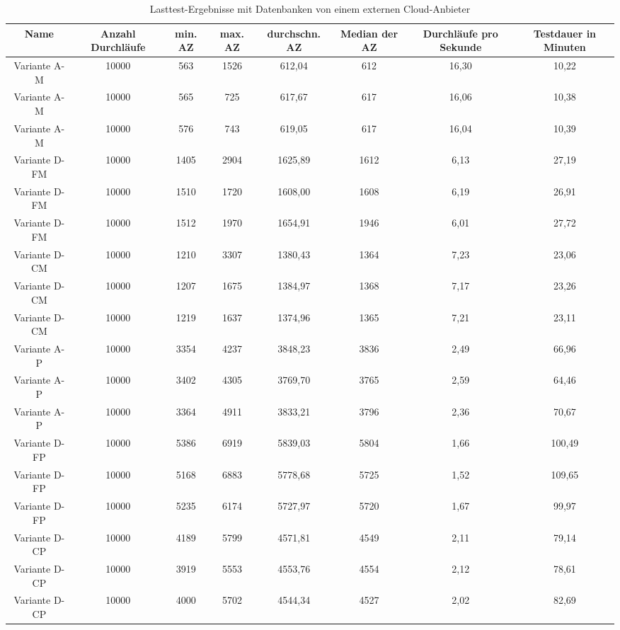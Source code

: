 \begin{landscape}
	\begin{table}[h!]
		\centering
		\small
		\begin{tabular}{ |c|c|c|c|c|c|c|c|} 
			\hline
			Name & Anzahl Durchläufe & min. AZ & max. AZ & durchschn. AZ & Median der AZ & Durchläufe pro Sekunde & Testdauer in Minuten\\ 
			\hline
			Variante A-M & 10000 & 563 & 1526 & 612,04 & 612 & 16,30 & 10,22 \\
			\hline
			Variante A-M & 10000 & 565 & 725 & 617,67 & 617 & 16,06 & 10,38 \\
			\hline
			Variante A-M & 10000 & 576 & 743 & 619,05 & 617 & 16,04 & 10,39 \\
			\hline
			Variante D-FM & 10000 & 1405 & 2904 & 1625,89 & 1612 & 6,13 & 27,19 \\
			\hline
			Variante D-FM & 10000 & 1510 & 1720 & 1608,00 & 1608 & 6,19 & 26,91 \\
			\hline
			Variante D-FM & 10000 & 1512 & 1970 & 1654,91 & 1946 & 6,01 & 27,72 \\
			\hline
			Variante D-CM & 10000 & 1210 & 3307 & 1380,43 & 1364 & 7,23 & 23,06 \\
			\hline
			Variante D-CM & 10000 & 1207 & 1675 & 1384,97 & 1368 & 7,17 & 23,26 \\
			\hline
			Variante D-CM & 10000 & 1219 & 1637 & 1374,96 & 1365 & 7,21 & 23,11 \\
			\hline
			Variante A-P & 10000 & 3354 & 4237 & 3848,23 & 3836 & 2,49 & 66,96 \\
			\hline
			Variante A-P & 10000 & 3402 & 4305 & 3769,70 & 3765 & 2,59 & 64,46 \\
			\hline
			Variante A-P & 10000 & 3364 & 4911 & 3833,21 & 3796 & 2,36 & 70,67 \\
			\hline
			Variante D-FP & 10000 & 5386 & 6919 & 5839,03 & 5804 & 1,66 & 100,49 \\
			\hline
			Variante D-FP & 10000 & 5168 & 6883 & 5778,68 & 5725 & 1,52 & 109,65 \\
			\hline
			Variante D-FP & 10000 & 5235 & 6174 & 5727,97 & 5720 & 1,67 & 99,97 \\
			\hline
			Variante D-CP & 10000 & 4189 & 5799 & 4571,81 & 4549 & 2,11 & 79,14 \\
			\hline
			Variante D-CP & 10000 & 3919 & 5553 & 4553,76 & 4554 & 2,12 & 78,61 \\
			\hline
			Variante D-CP & 10000 & 4000 & 5702 & 4544,34 & 4527 & 2,02 & 82,69 \\
			\hline
		\end{tabular}
		\caption{Lasttest-Ergebnisse mit Datenbanken von einem externen Cloud-Anbieter}
		\label{fig:performance-delay}
	\end{table}
\end{landscape}

